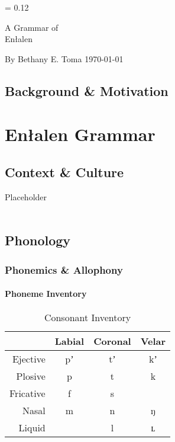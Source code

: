\documentclass[a4paper,11pt,oneside,openany]{memoir}
\newlength{\drop}%
\newcommand*{\titleP}{\begingroup%
\drop = 0.12\textheight
\vspace*{\drop}
\begin{center}
{\huge A Grammar of}\\[\baselineskip]
{\HUGE\sc \parentlang}\par
\end{center}
\vspace*{3\drop}
{\large By {\sc Bethany E. Toma}}
\vfill
{\today}
\vspace*{0.5\drop}
\endgroup}
\newcommand{\parentlang}{Enłalen}
\begin{document}
\begin{titlingpage}
\titleP
\end{titlingpage}
\frontmatter

\chapter{Background \& Motivation}
\clearpage
\tableofcontents


\printnoidxglossary[type=\leipzigtype,title={Glossing Abbreviations}]

\mainmatter

\part{\parentlang{} Grammar}

\chapter{Context \& Culture}

Placeholder \\
\Fsg \\
\Spl

\chapter{Phonology}

\section{Phonemics \& Allophony}

\subsection{Phoneme Inventory}

\begin{table}[h]
    \centering
    \begin{tabular}{@{}rccc@{}}
    \toprule
     & Labial & Coronal & Velar \\ \midrule
    Ejective & pʼ & tʼ & kʼ \\
    Plosive & p & t & k \\
    Fricative & f & s & \\
    Nasal & m & n & ŋ \\
    Liquid &  & l & ʟ \\ \bottomrule
    \end{tabular}
    \caption{Consonant Inventory}
    \label{tab:enl-consonants}
\end{table}
\end{document}
